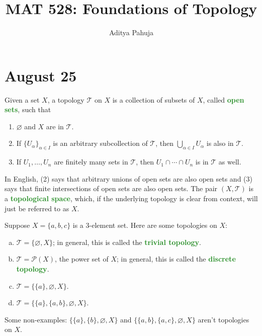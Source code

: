 \documentclass[11pt]{scrartcl}
\title{\vspace{-2em}MAT 528: Foundations of Topology}
\author{\large Aditya Pahuja}
\date{}
\providecommand{\ii}{\item}
\providecommand{\vocab}[1]{{\textbf{\textcolor{ForestGreen}{#1}}}}
\begin{document}
\maketitle
\tableofcontents
\pagebreak

\section{August 25}\label{sec:aug25}
\begin{definition}
    \label{def:topspace}
    Given a set $X$, a topology $\mathcal T$ on $X$ is
    a collection of subsets of $X$, called \vocab{open sets}, such that
    \begin{enumerate}[(1)]
	\ii $\varnothing$ and $X$ are in $\mathcal T$.
	\ii If $\{U_\alpha\}_{\alpha\in I}$ is
	an arbitrary subcollection of $\mathcal T$, then
	$\bigcup_{\alpha\in I}U_\alpha$ is also in $\mathcal T$.
	\ii If $U_1,\dots,U_n$ are finitely many sets in $\mathcal T$,
	then $U_1\cap\cdots\cap U_n$ is in $\mathcal T$ as well.
    \end{enumerate}
    In English, (2) says that arbitrary unions of open sets are also open sets
    and (3) says that finite intersections of open sets are also open sets.
    The pair $(X,\mathcal T)$ is a \vocab{topological space},
    which, if the underlying topology is clear from context,
    will just be referred to as $X$.
\end{definition}

\begin{example}
    Suppose $X = \{a,b,c\}$ is a $3$-element set.
    Here are some topologies on $X$:
    \begin{enumerate}[(a)]
	\ii $\mathcal T = \{\varnothing, X\}$;
	in general, this is called the \vocab{trivial topology}.
	\ii $\mathcal T = \mathcal P(X)$, the power set of $X$;
	in general, this is called the \vocab{discrete topology}.
	\ii $\mathcal T = \{\{a\}, \varnothing, X\}$.
	\ii $\mathcal T = \{\{a\}, \{a,b\}, \varnothing, X\}$.
    \end{enumerate}
    Some non-examples: $\{\{a\}, \{b\}, \varnothing, X\}$
    and $\{\{a,b\}, \{a,c\}, \varnothing, X\}$ aren't topologies on $X$.
\end{example}
\end{document}
